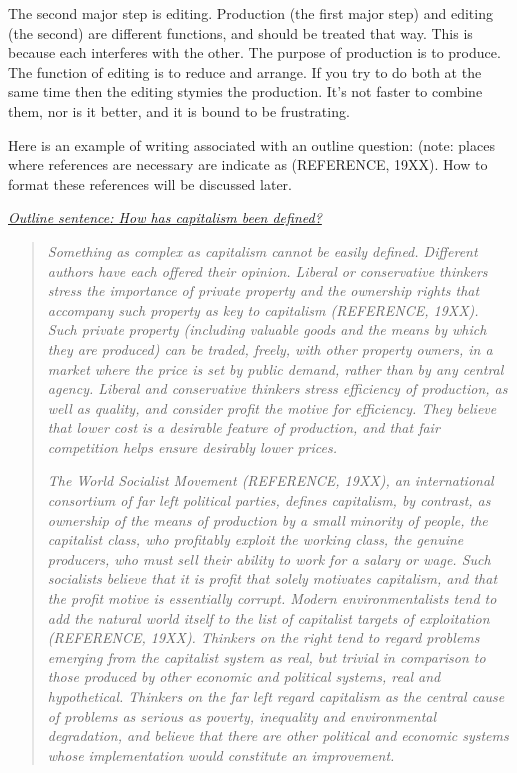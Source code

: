 \documentclass{article}
\begin{document}
The second major step is editing. Production (the first major step) and
editing (the second) are different functions, and should be treated that
way. This is because each interferes with the other. The purpose of
production is to produce. The function of editing is to reduce and
arrange. If you try to do both at the same time then the editing stymies
the production. It's not faster to combine them, nor is it better, and
it is bound to be frustrating.

Here is an example of writing associated with an outline question:
(note: places where references are necessary are indicate as (REFERENCE,
19XX). How to format these references will be discussed later.

\textit{\ul{Outline sentence: How has capitalism been defined?}}

\begin{quote}
\emph{Something as complex as capitalism cannot be easily defined.
Different authors have each offered their opinion. Liberal or
conservative thinkers stress the importance of private property and the
ownership rights that accompany such property as key to capitalism
(REFERENCE, 19XX). Such private property (including valuable goods and
the means by which they are produced) can be traded, freely, with other
property owners, in a market where the price is set by public demand,
rather than by any central agency. Liberal and conservative thinkers
stress efficiency of production, as well as quality, and consider profit
the motive for efficiency. They believe that lower cost is a desirable
feature of production, and that fair competition helps ensure desirably
lower prices.}

\emph{The World Socialist Movement (REFERENCE, 19XX), an international
consortium of far left political parties, defines capitalism, by
contrast, as ownership of the means of production by a small minority of
people, the capitalist class, who profitably exploit the working class,
the genuine producers, who must sell their ability to work for a salary
or wage. Such socialists believe that it is profit that solely motivates
capitalism, and that the profit motive is essentially corrupt. Modern
environmentalists tend to add the natural world itself to the list of
capitalist targets of exploitation (REFERENCE, 19XX). Thinkers on the
right tend to regard problems emerging from the capitalist system as
real, but trivial in comparison to those produced by other economic and
political systems, real and hypothetical. Thinkers on the far left
regard capitalism as the central cause of problems as serious as
poverty, inequality and environmental degradation, and believe that
there are other political and economic systems whose implementation
would constitute an improvement.}
\end{quote}
\end{document}
